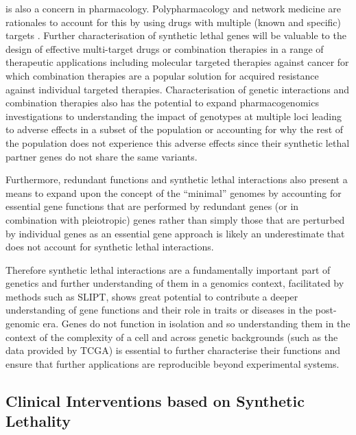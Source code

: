  is also a concern in pharmacology. Polypharmacology and network medicine are rationales to account for this by using drugs with multiple (known and specific) targets \citep{Hopkins2008, Barabasi2011}. Further characterisation of \gls{synthetic lethal} genes will be valuable to the design of effective multi-target drugs or combination therapies in a range of therapeutic applications including molecular targeted therapies against cancer for which combination therapies are a popular solution for acquired resistance against individual targeted therapies. Characterisation of genetic interactions and combination therapies also has the potential to expand pharmacogenomics investigations to understanding the impact of genotypes at multiple loci leading to adverse effects in a subset of the population or accounting for why the rest of the population does not experience this adverse effects since their \gls{synthetic lethal} partner genes do not share the same variants.

Furthermore, redundant functions and \gls{synthetic lethal} interactions also present a means to expand upon the concept of the ``minimal'' \glspl{genome} by accounting for \gls{essential} gene functions that are performed by redundant genes (or in combination with pleiotropic) genes rather than simply those that are perturbed by individual genes as an \gls{essential} gene approach is likely an underestimate that does not account for \gls{synthetic lethal} interactions. 

Therefore \gls{synthetic lethal} interactions are a fundamentally important part of genetics and further understanding of them in a \glspl{genomic} context, facilitated by methods such as \gls{SLIPT}, shows great potential to contribute a deeper understanding of gene functions and their role in traits or diseases in the post-genomic era. Genes do not function in isolation and so understanding them in the context of the complexity of a cell and across genetic backgrounds (such as the data provided by \gls{TCGA}) is \gls{essential} to further characterise their functions and ensure that further applications are reproducible beyond experimental systems.


\subsection{Clinical Interventions based on Synthetic Lethality}
\label{chapt6:significance_clinic}

